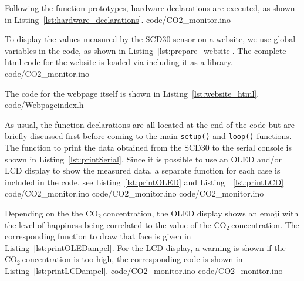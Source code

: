 \documentclass[12pt,a4paper]{article}
\newcommand{\coo}{\ensuremath{\mathrm{CO_2}~}}
\begin{document}
Following the function prototypes, hardware declarations are executed, as shown in Listing~\ref{lst:hardware_declarations}.
%
{code/CO2_monitor.ino} 

To display the values measured by the SCD30 sensor on a website, we use global variables in the code, as shown in Listing~\ref{lst:prepare_website}. The complete html code for the website is loaded via including it as a library.
%
{code/CO2_monitor.ino}

The code for the webpage itself is shown in Listing~\ref{lst:website_html}.
%
{code/Webpageindex.h}

As usual, the function declarations are all located at the end of the code but are briefly discussed first before coming to the main \texttt{setup()} and \texttt{loop()} functions. The function to print the data obtained from the SCD30 to the serial console is shown in Listing~\ref{lst:printSerial}. Since it is possible to use an OLED and/or LCD display to show the measured data, a separate function for each case is included in the code, see Listing~\ref{lst:printOLED} and Listing~~\ref{lst:printLCD}
%
{code/CO2_monitor.ino} 
%
{code/CO2_monitor.ino} 
%
{code/CO2_monitor.ino} 

Depending on the the \coo concentration, the OLED display shows an emoji with the level of happiness being correlated to the value of the \coo concentration. The corresponding function to draw that face is given in Listing~\ref{lst:printOLEDampel}. For the LCD display, a warning is shown if the \coo concentration is too high, the corresponding code is shown in Listing~\ref{lst:printLCDampel}.
%
{code/CO2_monitor.ino} 
%
{code/CO2_monitor.ino} 
\end{document}
